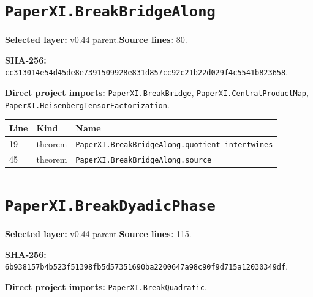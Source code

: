 \documentclass[10pt,oneside]{book}
\begin{document}
\section{\texorpdfstring{\nolinkurl{PaperXI.BreakBridgeAlong}}{PaperXI.BreakBridgeAlong}}\label{module:PaperXI.BreakBridgeAlong}

\textbf{Selected layer:} v0.44 parent.\quad\textbf{Source lines:} 80.\par\textbf{SHA-256:} {\scriptsize\nolinkurl{cc313014e54d45de8e7391509928e831d857cc92c21b22d029f4c5541b823658}}.


\textbf{Direct project imports:} \nolinkurl{PaperXI.BreakBridge}, \nolinkurl{PaperXI.CentralProductMap}, \nolinkurl{PaperXI.HeisenbergTensorFactorization}.

\begin{longtable}{@{}p{}p{}p{}@{}}\toprule Line&Kind&Name\\\midrule\endhead

19&theorem&\nolinkurl{PaperXI.BreakBridgeAlong.quotient_intertwines}\\

45&theorem&\nolinkurl{PaperXI.BreakBridgeAlong.source}\\

\bottomrule\end{longtable}

\section{\texorpdfstring{\nolinkurl{PaperXI.BreakDyadicPhase}}{PaperXI.BreakDyadicPhase}}\label{module:PaperXI.BreakDyadicPhase}

\textbf{Selected layer:} v0.44 parent.\quad\textbf{Source lines:} 115.\par\textbf{SHA-256:} {\scriptsize\nolinkurl{6b938157b4b523f51398fb5d57351690ba2200647a98c90f9d715a12030349df}}.


\textbf{Direct project imports:} \nolinkurl{PaperXI.BreakQuadratic}.
\end{document}
